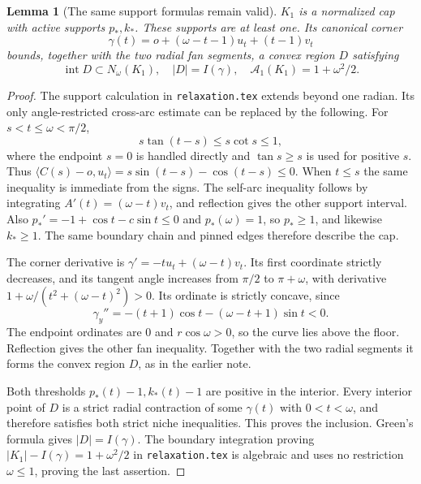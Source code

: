 \documentclass[11pt]{article}
\newtheorem{lemma}[theorem]{Lemma}
\newcommand{\ip}[2]{\langle #1,#2\rangle}
\begin{document}
\begin{lemma}[The same support formulas remain valid]\label{lem:cap}
$K_1$ is a normalized cap with active supports $p_*,k_*$. These supports are at least one. Its canonical corner
\[
 \gamma(t)=o+(\omega-t-1)u_t+(t-1)v_t
\]
bounds, together with the two radial fan segments, a convex region $D$ satisfying
\[
 \operatorname{int}D\subset N_\omega(K_1),\quad |D|=I(\gamma),\quad
 \mathcal A_1(K_1)=1+\omega^2/2.
\]
\end{lemma}
\begin{proof}
The support calculation in \texttt{relaxation.tex} extends beyond one radian. Its only angle-restricted cross-arc estimate can be replaced by the following. For $s<t\le\omega<\pi/2$,
\[
 s\tan(t-s)\le s\cot s\le1,
\]
where the endpoint $s=0$ is handled directly and $\tan s\ge s$ is used for positive $s$. Thus
$\ip{C(s)-o}{u_t}=s\sin(t-s)-\cos(t-s)\le0$. When $t\le s$ the same inequality is immediate from the signs. The self-arc inequality follows by integrating $A'(t)=(\omega-t)v_t$, and reflection gives the other support interval. Also $p_*'=-1+\cos t-c\sin t\le0$ and $p_*(\omega)=1$, so $p_*\ge1$, and likewise $k_*\ge1$. The same boundary chain and pinned edges therefore describe the cap.

The corner derivative is $\gamma'=-t u_t+(\omega-t)v_t$. Its first coordinate strictly decreases, and its tangent angle increases from $\pi/2$ to $\pi+\omega$, with derivative $1+\omega/(t^2+(\omega-t)^2)>0$. Its ordinate is strictly concave, since
\[
 \gamma_y''=-(t+1)\cos t-(\omega-t+1)\sin t<0.
\]
The endpoint ordinates are $0$ and $r\cos\omega>0$, so the curve lies above the floor. Reflection gives the other fan inequality. Together with the two radial segments it forms the convex region $D$, as in the earlier note.

Both thresholds $p_*(t)-1,k_*(t)-1$ are positive in the interior. Every interior point of $D$ is a strict radial contraction of some $\gamma(t)$ with $0<t<\omega$, and therefore satisfies both strict niche inequalities. This proves the inclusion. Green's formula gives $|D|=I(\gamma)$. The boundary integration proving $|K_1|-I(\gamma)=1+\omega^2/2$ in \texttt{relaxation.tex} is algebraic and uses no restriction $\omega\le1$, proving the last assertion.
\end{proof}
\end{document}
